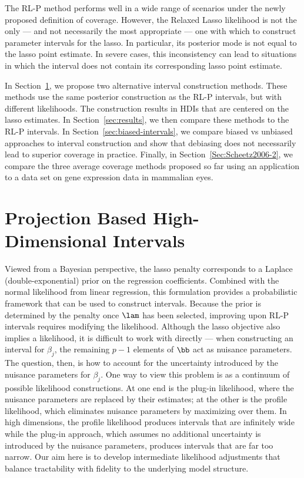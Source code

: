 The RL-P method performs well in a wide range of scenarios under the newly proposed definition of coverage. However, the Relaxed Lasso likelihood is not the only --- and not necessarily the most appropriate --- one with which to construct parameter intervals for the lasso. In particular, its posterior mode is not equal to the lasso point estimate. In severe cases, this inconsistency can lead to situations in which the interval does not contain its corresponding lasso point estimate.

In Section~\ref{sec:proj-int}, we propose two alternative interval construction methods. These methods use the same posterior construction as the RL-P intervals, but with different likelihoods. The construction results in HDIs that are centered on the lasso estimates. In Section~\ref{sec:results}, we then compare these methods to the RL-P intervals. In Section~\ref{sec:biased-intervals}, we compare biased vs unbiased approaches to interval construction and show that debiasing does not necessarily lead to superior coverage in practice. Finally, in Section~\ref{Sec:Scheetz2006-2}, we compare the three average coverage methods proposed so far using an application to a data set on gene expression data in mammalian eyes.

\section{Projection Based High-Dimensional Intervals}
\label{sec:proj-int}

Viewed from a Bayesian perspective, the lasso penalty corresponds to a Laplace (double-exponential) prior on the regression coefficients. Combined with the normal likelihood from linear regression, this formulation provides a probabilistic framework that can be used to construct intervals. Because the prior is determined by the penalty once $\lam$ has been selected, improving upon RL-P intervals requires modifying the likelihood. Although the lasso objective also implies a likelihood, it is difficult to work with directly --- when constructing an interval for $\beta_j$, the remaining $p-1$ elements of $\bb$ act as nuisance parameters. The question, then, is how to account for the uncertainty introduced by the nuisance parameters for $\beta_j$. One way to view this problem is as a continuum of possible likelihood constructions. At one end is the plug-in likelihood, where the nuisance parameters are replaced by their estimates; at the other is the profile likelihood, which eliminates nuisance parameters by maximizing over them. In high dimensions, the profile likelihood produces intervals that are infinitely wide while the plug-in approach, which assumes no additional uncertainty is introduced by the nuisance parameters, produces intervals that are far too narrow. Our aim here is to develop intermediate likelihood adjustments that balance tractability with fidelity to the underlying model structure.

